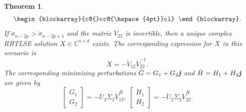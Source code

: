 \documentclass[preprint,11pt,3p]{elsarticle}
\newtheorem{theorem}{Theorem}[section]
\def \C{{\mathbb C}}
\def \j{\textit{\textbf{j}}}
\begin{document}
\begin{theorem}
\begin{equation}
\begin{blockarray}{c@{}cc@{\hspace{4pt}}cl}
		\end{blockarray}.
	\end{equation}
		If \(\grave{\sigma}_{n-2p} > \grave{\sigma}_{n-2p+1}\) and the matrix \(\acute{V}_{22}\) is invertible, then a unique complex RBTLSE solution $X \in \C^{n \times d}$ exists. The corresponding expression for $X$ in this scenario is
	\begin{equation}\label{comsol}
	X = -\acute{V}_{12} \acute{V}_{22}^{-1}.
	\end{equation}
The corresponding minimizing perturbations \(\bar{G} = G_1 + G_2 \j\) and \(\bar{H} = H_1 + H_2 \j\) are given by
	\[
	\begin{bmatrix} G_1 \\ G_2 \end{bmatrix} = -\grave{U}_2 \grave{\Sigma}_2 \acute{V}_{12}^H, ~
	\begin{bmatrix} H_1 \\ H_2 \end{bmatrix} = -\grave{U}_2 \grave{\Sigma}_2 \acute{V}_{22}^H.
	\]
\end{theorem}
\end{document}

